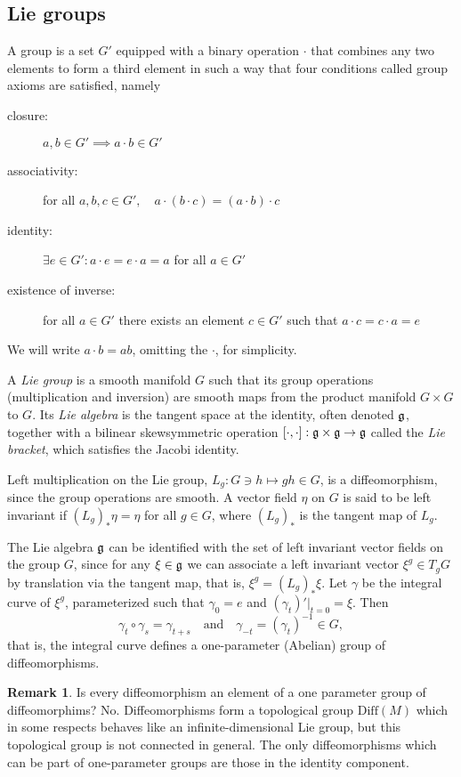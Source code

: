 \documentclass{article}
\theoremstyle{plain}
\theoremstyle{definition}
\newtheorem{oss}[teo]{Remark}
\numberwithin{equation}{section}
\newcommand{\Diff}{\ensuremath{\mathrm{Diff}}}
\newcommand{\mf}{\ensuremath{\mathfrak}}
\begin{document}
\subsection{Lie groups}
A  group is a set $G'$ equipped with a binary operation $\cdot$ that combines any two elements to form a third element in such a way that four conditions called group axioms are satisfied, namely
%
\begin{description}
	\item[closure:] $a,b\in G' \implies a\cdot b\in G'$
	\item[associativity:] for all $a,b,c\in G',\quad a\cdot(b\cdot c)=(a\cdot b)\cdot c$
	\item[identity:] $\exists e\in G' : a\cdot e=e\cdot a=a$ for all $a\in G'$
	\item[existence of inverse:] for all $a\in G'$ there exists an element $c\in G'$ such that $a\cdot c=c\cdot a=e$
\end{description}
%
We will write $a\cdot b=ab$, omitting the $\cdot$, for simplicity.

A \textit{Lie group} is a smooth manifold $G$ such that its group operations (multiplication and inversion) are smooth maps from the product manifold $G\times G$ to $G$. Its \textit{Lie algebra} is the tangent space at the identity, often denoted $\mf g$, together with a bilinear skewsymmetric operation $[\cdot,\cdot]:\mf g \times \mf g \to\mf g$ called the \textit{Lie bracket}, which satisfies the Jacobi identity. 

Left multiplication on the Lie group, $L_g: G\ni h\mapsto gh\in G$, is a diffeomorphism, since the group operations are smooth. A vector field $\eta$ on $G$ is said to be left invariant if $(L_g)_*\eta=\eta$ for all $g\in G$, where $(L_g)_*$ is the tangent map of $L_g$.

The Lie algebra $\mf g$ can be identified with the set of left invariant vector fields on the group $G$, since for any $\xi\in\mf g$ we can associate a left invariant vector $\xi^g\in T_gG$ by translation via the tangent map, that is, $\xi^g=(L_g)_*\xi$. Let $\gamma$ be the integral curve of $\xi^g$, parameterized such that $\gamma_0=e$ and $(\gamma_t)'|_{t=0}=\xi$. Then
\[
  \gamma_t\circ \gamma_s=\gamma_{t+s}\quad \mathrm{and}\quad \gamma_{-t}=(\gamma_t)^{-1}\in G,
\]
that is, the integral curve defines a one-parameter (Abelian) group of diffeomorphisms.

\begin{oss}
	Is every diffeomorphism an element of a one parameter group of diffeomorphims? No. Diffeomorphisms form a topological group $\Diff(M)$ which in some respects behaves like an infinite-dimensional Lie group, but this topological group is not connected in general. The only diffeomorphisms which can be part of one-parameter groups are those in the identity component.
\end{oss}
\end{document}

